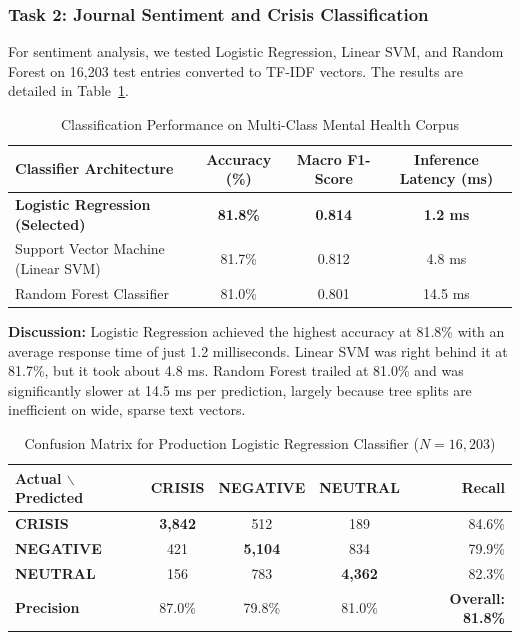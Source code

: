 \subsubsection{Task 2: Journal Sentiment and Crisis Classification}
For sentiment analysis, we tested Logistic Regression, Linear SVM, and Random Forest on 16,203 test entries converted to TF-IDF vectors. The results are detailed in Table~\ref{tab:sentiment_results}.

\begin{table}[H]
\centering
\caption{Classification Performance on Multi-Class Mental Health Corpus}
\label{tab:sentiment_results}
\begin{tabular}{lccc}
\toprule
\textbf{Classifier Architecture} & \textbf{Accuracy (\%)} & \textbf{Macro F1-Score} & \textbf{Inference Latency (ms)} \\
\midrule
\textbf{Logistic Regression (Selected)} & \textbf{81.8\%} & \textbf{0.814} & \textbf{1.2 ms} \\
Support Vector Machine (Linear SVM)     & 81.7\%          & 0.812          & 4.8 ms          \\
Random Forest Classifier                & 81.0\%          & 0.801          & 14.5 ms         \\
\bottomrule
\end{tabular}
\end{table}

\noindent \textbf{Discussion:} Logistic Regression achieved the highest accuracy at 81.8\% with an average response time of just 1.2 milliseconds. Linear SVM was right behind it at 81.7\%, but it took about 4.8 ms. Random Forest trailed at 81.0\% and was significantly slower at 14.5 ms per prediction, largely because tree splits are inefficient on wide, sparse text vectors.

\begin{table}[H]
\centering
\caption{Confusion Matrix for Production Logistic Regression Classifier ($N=16,203$)}
\label{tab:confusion_matrix}
\begin{tabular}{l|ccc|r}
\toprule
\textbf{Actual $\backslash$ Predicted} & \textbf{CRISIS} & \textbf{NEGATIVE} & \textbf{NEUTRAL} & \textbf{Recall} \\
\midrule
\textbf{CRISIS}   & \textbf{3,842} & 512            & 189            & 84.6\% \\
\textbf{NEGATIVE} & 421            & \textbf{5,104} & 834            & 79.9\% \\
\textbf{NEUTRAL}  & 156            & 783            & \textbf{4,362} & 82.3\% \\
\midrule
\textbf{Precision} & 87.0\%         & 79.8\%         & 81.0\%         & \textbf{Overall: 81.8\%} \\
\bottomrule
\end{tabular}
\end{table}

